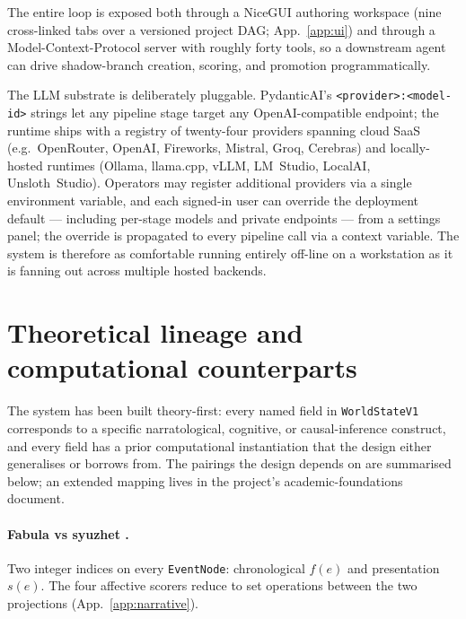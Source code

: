 \documentclass[11pt]{article}
\begin{document}
The entire loop is exposed both through a NiceGUI authoring
workspace (nine cross-linked tabs over a versioned project DAG;
App.~\ref{app:ui}) and through a Model-Context-Protocol server
with roughly forty tools, so a downstream agent can drive
shadow-branch creation, scoring, and promotion programmatically.

The LLM substrate is deliberately pluggable. PydanticAI's
\texttt{<provider>:<model-id>} strings let any pipeline stage
target any OpenAI-compatible endpoint; the runtime ships with a
registry of twenty-four providers spanning cloud SaaS (e.g.\
OpenRouter, OpenAI, Fireworks, Mistral, Groq, Cerebras) and
locally-hosted runtimes (Ollama, llama.cpp, vLLM, LM~Studio,
LocalAI, Unsloth~Studio). Operators may register additional
providers via a single environment variable, and each signed-in
user can override the deployment default --- including per-stage
models and private endpoints --- from a settings panel; the
override is propagated to every pipeline call via a context
variable. The system is therefore as comfortable running entirely
off-line on a workstation as it is fanning out across multiple
hosted backends.


\section{Theoretical lineage and computational counterparts}
\label{sec:lineage}

The system has been built theory-first: every named field in
\texttt{WorldStateV1} corresponds to a specific narratological,
cognitive, or causal-inference construct, and every field has a
prior computational instantiation that the design either
generalises or borrows from. The pairings the design depends on
are summarised below; an extended mapping lives in the project's
academic-foundations document.

\paragraph{Fabula vs syuzhet
\citep{shklovsky1965art,tomashevsky1965thematics,
genette1980narrative,bordwell1985narration,bal2009narratology}.}
Two integer indices on every \texttt{EventNode}: chronological
$f(e)$ and presentation $s(e)$. The four affective scorers reduce
to set operations between the two projections (App.~\ref{app:narrative}).
\end{document}
